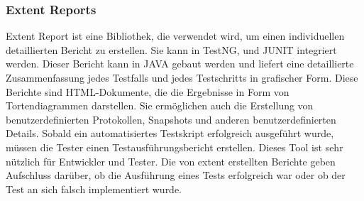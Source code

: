 \subsubsection{Extent Reports}

Extent Report ist eine Bibliothek, die verwendet wird, um einen individuellen
detaillierten Bericht zu erstellen. Sie kann in TestNG, und JUNIT integriert
werden. Dieser Bericht kann in JAVA gebaut werden und liefert eine
detaillierte Zusammenfassung jedes Testfalls und jedes Testschritts in
grafischer Form. Diese Berichte sind HTML-Dokumente, die die Ergebnisse
in Form von Tortendiagrammen darstellen. Sie ermöglichen auch die Erstellung
von benutzerdefinierten Protokollen, Snapshots und anderen benutzerdefinierten
Details. Sobald ein automatisiertes Testskript erfolgreich ausgeführt wurde,
müssen die Tester einen Testausführungsbericht erstellen. Dieses Tool ist
sehr nützlich für Entwickler und Tester. Die von extent erstellten Berichte
geben Aufschluss darüber, ob die Ausführung eines Tests erfolgreich war oder
ob der Test an sich falsch implementiert wurde.
